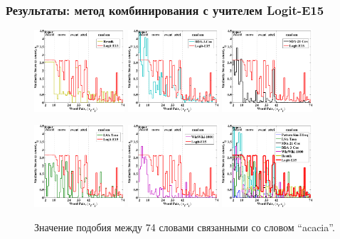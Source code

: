 \begin{frame}
\frametitle{Результаты: метод комбинирования с учителем Logit-E15}
\begin{figure}
\centering
\includegraphics[width=0.30\textwidth]{figures/acacia-resnik} 
\includegraphics[width=0.30\textwidth]{figures/acacia-bda}
\includegraphics[width=0.30\textwidth]{figures/acacia-sda}

\includegraphics[width=0.30\textwidth]{figures/acacia-lsa}
\includegraphics[width=0.30\textwidth]{figures/acacia-ww}
\includegraphics[width=0.30\textwidth]{figures/acacia}
\caption{ Значение подобия между 74 словами связанными со словом ``acacia''.
}
\label{fig:hybrid-complimentary-discussion}
\end{figure}

\end{frame}


